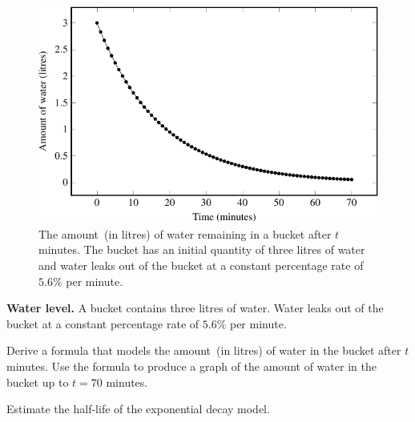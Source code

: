 \documentclass[a4paper,oneside,12pt]{article}
\begin{document}
\begin{figure}[!htbp]
\centering
\includegraphics[scale=1.1]{image/11/water.pdf}
\caption{%
  The amount~(in litres) of water remaining in a bucket after $t$
  minutes.  The bucket has an initial quantity of three litres of
  water and water leaks out of the bucket at a constant percentage
  rate of $5.6\%$ per minute.
}
\label{fig:exponential:bucket_water_level}
\end{figure}

\begin{example}
\label{eg:exponential:water_level}
\textbf{Water level.}
A bucket contains three litres of water.  Water leaks out of the
bucket at a constant percentage rate of $5.6\%$ per minute.
\begin{packedenum}
\item\label{subex:exponential:water_level_formula}
  Derive a formula that models the amount~(in litres) of water in the
  bucket after $t$ minutes.  Use the formula to produce a graph of the
  amount of water in the bucket up to $t = 70$ minutes.

\item\label{subex:exponential:water_level_half_life}
  Estimate the half-life of the exponential decay model.
\end{packedenum}
\end{example}
\end{document}
